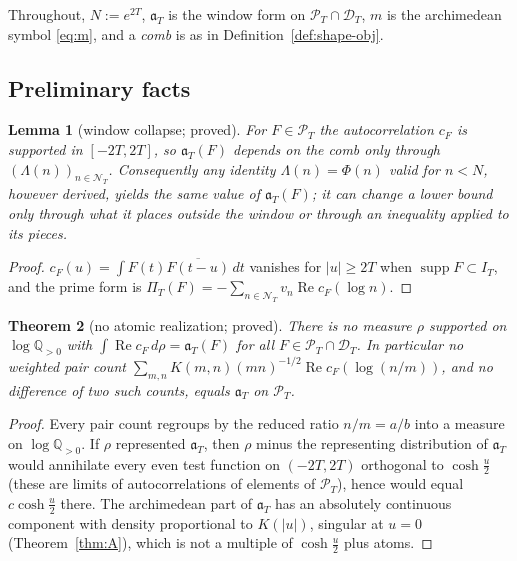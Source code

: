 \documentclass[11pt]{amsart}
\newtheorem{theorem}{Theorem}[section]
\newtheorem{lemma}[theorem]{Lemma}
\theoremstyle{definition}
\theoremstyle{remark}
\newcommand{\Q}{\mathbb Q}
\newcommand{\Rel}{\operatorname{Re}}
\newcommand{\supp}{\operatorname{supp}}
\newcommand{\PT}{\mathcal P_T}
\newcommand{\IT}{I_T}
\newcommand{\cF}{c_F}
\newcommand{\NT}{\mathcal N_T}
\newcommand{\PiT}{\Pi_T}
\begin{document}
Throughout, $N:=e^{2T}$, $\mathfrak a_T$ is the window form on $\PT\cap\mathcal D_T$, $m$ is the archimedean symbol \eqref{eq:m}, and a
\emph{comb} is as in Definition~\ref{def:shape-obj}.

\subsection{Preliminary facts}

\begin{lemma}[window collapse; proved]\label{lem:spec-collapse}
For $F\in\PT$ the autocorrelation $\cF$ is supported in $[-2T,2T]$, so $\mathfrak a_T(F)$ depends on the comb only through
$(\Lambda(n))_{n\in\NT}$. Consequently any identity $\Lambda(n)=\Phi(n)$ valid for $n<N$, however derived, yields the same value of
$\mathfrak a_T(F)$; it can change a lower bound only through what it places outside the window or through an inequality applied to its
pieces.
\end{lemma}
\begin{proof}
$\cF(u)=\int F(t)\overline{F(t-u)}\,dt$ vanishes for $|u|\ge2T$ when $\supp F\subset\IT$, and the prime form is
$\PiT(F)=-\sum_{n\in\NT}v_n\Rel\cF(\log n)$.
\end{proof}

\begin{theorem}[no atomic realization; proved]\label{thm:spec-noatom}
There is no measure $\rho$ supported on $\log\Q_{>0}$ with $\int\Rel\cF\,d\rho=\mathfrak a_T(F)$ for all $F\in\PT\cap\mathcal D_T$. In
particular no weighted pair count $\sum_{m,n}K(m,n)(mn)^{-1/2}\Rel\cF(\log(n/m))$, and no difference of two such counts, equals
$\mathfrak a_T$ on $\PT$.
\end{theorem}
\begin{proof}
Every pair count regroups by the reduced ratio $n/m=a/b$ into a measure on $\log\Q_{>0}$. If $\rho$ represented $\mathfrak a_T$, then
$\rho$ minus the representing distribution of $\mathfrak a_T$ would annihilate every even test function on $(-2T,2T)$ orthogonal to
$\cosh\frac u2$ (these are limits of autocorrelations of elements of $\PT$), hence would equal $c\cosh\frac u2$ there. The archimedean
part of $\mathfrak a_T$ has an absolutely continuous component with density proportional to $K(|u|)$, singular at $u=0$ (Theorem~\ref{thm:A}),
which is not a multiple of $\cosh\frac u2$ plus atoms.
\end{proof}
\end{document}
